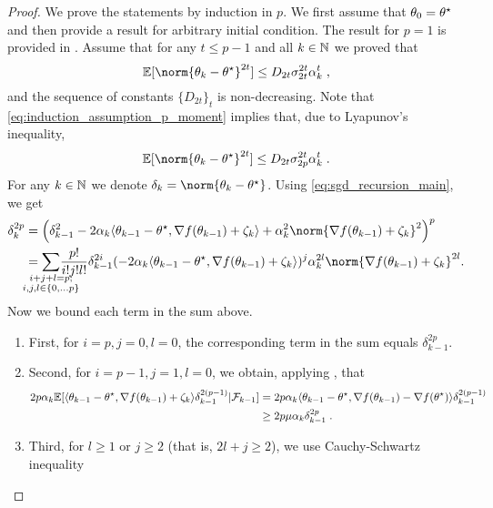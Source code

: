 \begin{proof}
We prove the statements by induction in $p$. We first assume that $\theta_0 = \theta^\star$ and then provide a result for arbitrary initial condition. The result for $p = 1$ is provided in  . Assume that for any $t\leq p-1$ and all $k \in \mathbb{N}$ we proved that 
\begin{equation}
\label{eq:induction_assumption_p_moment}
\PE[\norm{\theta_k - \thetas}^{2t}] \leq D_{2t} \sigma_{2t}^{2t} \alpha_{k}^{t}\eqsp,
\end{equation}
and the sequence of constants $\{D_{2t}\}_{t}$ is non-decreasing. Note that \eqref{eq:induction_assumption_p_moment} implies that, due to Lyapunov's inequality, 
\begin{equation}
\PE[\norm{\theta_k - \thetas}^{2t}] \leq D_{2t} \sigma_{2p}^{2t} \alpha_{k}^{t}\eqsp.  
\end{equation}
For any $k\in \mathbb{N}$ we denote $\delta_k= \norm{\theta_k - \thetas}$. Using \eqref{eq:sgd_recursion_main}, we get 
\begin{align}
\delta_k^{2p} 
&= \left(\delta_{k-1}^2 - 2\alpha_k\langle\theta_{k-1}-\thetas, \nabla f(\theta_{k-1}) + \zeta_k \rangle + \alpha_k^2\norm{\nabla f(\theta_{k-1}) + \zeta_k}^2\right)^p \\
&= \underset{\mathclap{\substack{i+j+l=p;\\ i,j,l \in \{0,\ldots p\}}}}{\sum}\frac{p!}{i!j!l!}\delta_{k-1}^{2i}(-2\alpha_k\langle\theta_{k-1}-\thetas, \nabla f(\theta_{k-1})+\zeta_k\rangle)^j\alpha_k^{2l}\norm{\nabla f(\theta_{k-1}) + \zeta_k}^{2l}.
\end{align}
Now we bound each term in the sum above.
\begin{enumerate}
        \item First, for $i=p, j=0, l=0$, the corresponding term in the sum equals $\delta_{k-1}^{2p}$.
        \item Second, for $i=p-1, j=1, l=0$, we obtain, applying , that 
        \begin{align}
        2p\alpha_k \mathbb{E} [\langle\theta_{k-1}-\theta^\star, \nabla f(\theta_{k-1}) +\zeta_k \rangle\delta_{k-1}^{2(p-1)}|\mathcal{F}_{k-1}] 
        &= 2p\alpha_k\langle\theta_{k-1}-\theta^\star, \nabla f(\theta_{k-1})- \nabla f(\theta^\star)  \rangle\delta_{k-1}^{2(p-1)} \\
        &\geq 2 p \mu \alpha_k \delta_{k-1}^{2 p}\;.
        \end{align}
        \item Third, for $l \geq 1$ or $j \geq 2$ (that is,  $2l+j \geq 2$), we use Cauchy-Schwartz inequality  

\end{enumerate}
\end{proof}
